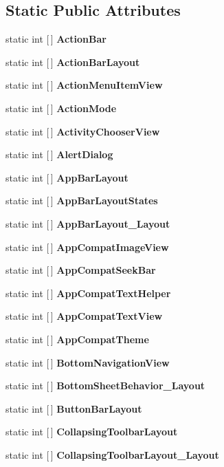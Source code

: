 \subsection*{Static Public Attributes}
\begin{DoxyCompactItemize}
\item 
static int \mbox{[}$\,$\mbox{]} {\bfseries Action\+Bar}
\item 
static int \mbox{[}$\,$\mbox{]} {\bfseries Action\+Bar\+Layout}
\item 
static int \mbox{[}$\,$\mbox{]} {\bfseries Action\+Menu\+Item\+View}
\item 
static int \mbox{[}$\,$\mbox{]} {\bfseries Action\+Mode}
\item 
static int \mbox{[}$\,$\mbox{]} {\bfseries Activity\+Chooser\+View}
\item 
static int \mbox{[}$\,$\mbox{]} {\bfseries Alert\+Dialog}
\item 
static int \mbox{[}$\,$\mbox{]} {\bfseries App\+Bar\+Layout}
\item 
static int \mbox{[}$\,$\mbox{]} {\bfseries App\+Bar\+Layout\+States}
\item 
static int \mbox{[}$\,$\mbox{]} {\bfseries App\+Bar\+Layout\+\_\+\+Layout}
\item 
static int \mbox{[}$\,$\mbox{]} {\bfseries App\+Compat\+Image\+View}
\item 
static int \mbox{[}$\,$\mbox{]} {\bfseries App\+Compat\+Seek\+Bar}
\item 
static int \mbox{[}$\,$\mbox{]} {\bfseries App\+Compat\+Text\+Helper}
\item 
static int \mbox{[}$\,$\mbox{]} {\bfseries App\+Compat\+Text\+View}
\item 
\mbox{\label{classst_delivery_1_1_resource_1_1_styleable_a162a0886e96ab96af16b6b94407abc53}} 
static int \mbox{[}$\,$\mbox{]} {\bfseries App\+Compat\+Theme}
\item 
static int \mbox{[}$\,$\mbox{]} {\bfseries Bottom\+Navigation\+View}
\item 
static int \mbox{[}$\,$\mbox{]} {\bfseries Bottom\+Sheet\+Behavior\+\_\+\+Layout}
\item 
static int \mbox{[}$\,$\mbox{]} {\bfseries Button\+Bar\+Layout}
\item 
static int \mbox{[}$\,$\mbox{]} {\bfseries Collapsing\+Toolbar\+Layout}
\item 
static int \mbox{[}$\,$\mbox{]} {\bfseries Collapsing\+Toolbar\+Layout\+\_\+\+Layout}

\end{DoxyCompactItemize}
